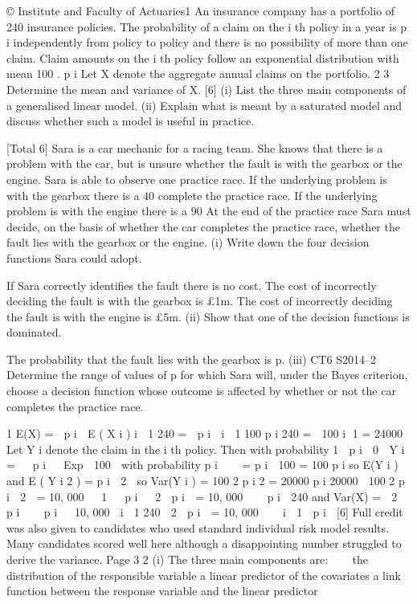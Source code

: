 \documentclass[a4paper,12pt]{article}
\begin{document}
\begin{enumerate}

© Institute and Faculty of Actuaries1
An insurance company has a portfolio of 240 insurance policies. The probability of a
claim on the i th policy in a year is p i independently from policy to policy and there is
no possibility of more than one claim. Claim amounts on the i th policy follow an
exponential distribution with mean 100 .
p i
Let X denote the aggregate annual claims on the portfolio.
2
3
Determine the mean and variance of X. [6]
(i) List the three main components of a generalised linear model. 
(ii) Explain what is meant by a saturated model and discuss whether such a model
is useful in practice.

[Total 6]
Sara is a car mechanic for a racing team. She knows that there is a problem with the
car, but is unsure whether the fault is with the gearbox or the engine. Sara is able to
observe one practice race.
If the underlying problem is with the gearbox there is a 40%
complete the practice race. If the underlying problem is with the engine there is a
90%
At the end of the practice race Sara must decide, on the basis of whether the car
completes the practice race, whether the fault lies with the gearbox or the engine.
(i)
Write down the four decision functions Sara could adopt.

If Sara correctly identifies the fault there is no cost. The cost of incorrectly deciding
the fault is with the gearbox is £1m. The cost of incorrectly deciding the fault is with
the engine is £5m.
(ii)
Show that one of the decision functions is dominated.

The probability that the fault lies with the gearbox is p.
(iii)
CT6 S2014–2
Determine the range of values of p for which Sara will, under the Bayes
criterion, choose a decision function whose outcome is affected by whether or
not the car completes the practice race.

\newpage


1
E(X)
=
 p i  E ( X i )
i  1
240
=
 p i 
i  1
100
p i
240
=
 100
i 1
= 24000
Let Y i denote the claim in the i th policy. Then
with probability 1  p i
 0

Y i = 
 p i 
 Exp  100  with probability p i



= p i 
100
= 100
p i
so E(Y i )
and E ( Y i 2 ) = p i  2 
so Var(Y i ) =
100 2
p i 2
=
20000
p i
20000
 100 2
p i
 2

= 10, 000   1 
 p i

 2  p i 
= 10, 000 

 p i 
240
and
Var(X) =
 2  p i 

 p i 
 10, 000 
i  1
240
 2  p i 
= 10, 000  

i  1  p i 
[6]
Full credit was also given to candidates who used standard individual risk model results.
Many candidates scored well here although a disappointing number struggled to derive the
variance.
Page 3%
2
(i)
The three main components are:



the distribution of the responsible variable
a linear predictor of the covariates
a link function between the response variable and the linear predictor


\end{enumerate}
\end{document}
